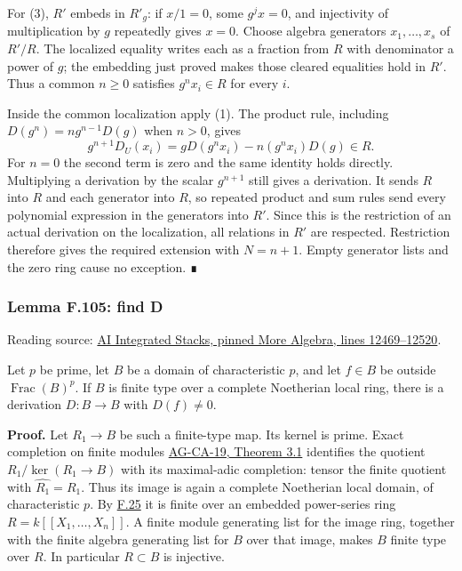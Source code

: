 \documentclass[11pt,a4paper,openany]{report}
\begin{document}
For (3), \(R'\) embeds in \(R'_g\): if \(x/1=0\), some \(g^j x=0\), and injectivity of multiplication by \(g\) repeatedly gives \(x=0\). Choose algebra generators \(x_1,\ldots,x_s\) of \(R'/R\). The localized equality writes each as a fraction from \(R\) with denominator a power of \(g\); the embedding just proved makes those cleared equalities hold in \(R'\). Thus a common \(n\ge0\) satisfies \(g^nx_i\in R\) for every \(i\).

Inside the common localization apply (1). The product rule, including \(D(g^n)=ng^{n-1}D(g)\) when \(n>0\), gives \[g^{n+1}D_U(x_i)=gD(g^nx_i)-n(g^nx_i)D(g)\in R.\] For \(n=0\) the second term is zero and the same identity holds directly. Multiplying a derivation by the scalar \(g^{n+1}\) still gives a derivation. It sends \(R\) into \(R\) and each generator into \(R\), so repeated product and sum rules send every polynomial expression in the generators into \(R'\). Since this is the restriction of an actual derivation on the localization, all relations in \(R'\) are respected. Restriction therefore gives the required extension with \(N=n+1\). Empty generator lists and the zero ring cause no exception. ∎

\label{AG-RG-S05-more-algebra-lemma-find-D}

\subsubsection{Lemma F.105: find D}\label{AG-RG-S05-lemma-f.105-find-d}

Reading source: \href{https://github.com/KokunoYumeto/unofficial-stacks-project-ai-drafts/blob/565b10e987aba5969b21145a0833f42d69f96790/more-algebra.tex\#L12469-L12520}{AI Integrated Stacks, pinned More Algebra, lines 12469--12520}.

Let \(p\) be prime, let \(B\) be a domain of characteristic \(p\), and let \(f\in B\) be outside \(\operatorname{Frac}(B)^p\). If \(B\) is finite type over a complete Noetherian local ring, there is a derivation \(D:B\to B\) with \(D(f)\ne0\).

\textbf{Proof.} Let \(R_1\to B\) be such a finite-type map. Its kernel is prime. Exact completion on finite modules \href{https://github.com/KokunoYumeto/open-math-courses/blob/d02d0a3669f42579db037cd44de1d113fdd770a1/docs/courses/AG-CA/src/completion.md}{AG-CA-19, Theorem 3.1} identifies the quotient \(R_1/\ker(R_1\to B)\) with its maximal-adic completion: tensor the finite quotient with \(\widehat{R_1}=R_1\). Thus its image is again a complete Noetherian local domain, of characteristic \(p\). By \hyperref[AG-RG-S05-algebra-lemma-complete-local-Noetherian-domain-finite-over-regular]{F.25} it is finite over an embedded power-series ring \(R=k[[X_1,\ldots,X_n]]\). A finite module generating list for the image ring, together with the finite algebra generating list for \(B\) over that image, makes \(B\) finite type over \(R\). In particular \(R\subset B\) is injective.
\end{document}
